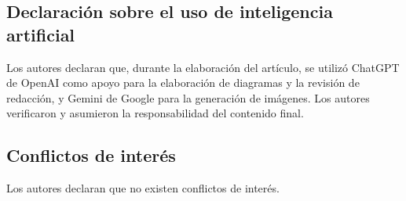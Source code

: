 \documentclass{espol-rte}
\begin{document}
\subsection{Declaraci\'on sobre el uso de inteligencia artificial}
Los autores declaran que, durante la elaboraci\'on del art\'iculo, se utiliz\'o ChatGPT de OpenAI como apoyo para la elaboraci\'on de diagramas y la revisi\'on de redacci\'on, y Gemini de Google para la generaci\'on de im\'agenes. Los autores verificaron y asumieron la responsabilidad del contenido final.

\subsection{Conflictos de inter\'es}
Los autores declaran que no existen conflictos de inter\'es.

\printbibliography[title={Referencias}]
\end{document}
